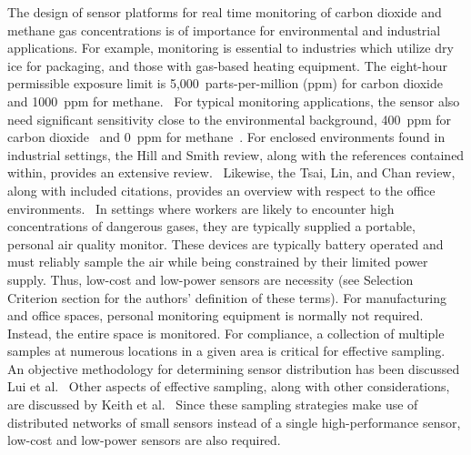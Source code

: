 \documentclass[times]{joehreview}
\begin{document}
	The design of sensor platforms for real time monitoring of carbon dioxide and methane gas concentrations is of importance for environmental and industrial applications.  For example, monitoring is essential to industries which utilize dry ice for packaging, and those with gas-based heating equipment.  The eight-hour permissible exposure limit is  5,000~parts-per-million (ppm) for carbon dioxide and 1000~ppm for methane.~\cite{centersfordiseasecontrolCentersDiseaseControl2016,centersfordiseasecontrolCentersDiseaseControl2015}  For typical monitoring applications, the sensor also need significant sensitivity close to the environmental background, 400~ppm for carbon dioxide~\cite{blasing_recent_2016,dlugokencky_trends_2016} and 0~ppm for methane~\cite{turner_large_2016,bamberger_spatial_2014,dlugokencky_trends_2016-1}.  For enclosed environments found in industrial settings, the Hill and Smith review, along with the references contained within, provides an extensive review.~\cite{exposure_assessment}  Likewise, the Tsai, Lin, and Chan review, along with included citations, provides an overview with respect to the office environments.~\cite{sick_building}  In settings where workers are likely to encounter high concentrations of dangerous gases, they are typically supplied a portable, personal air quality monitor.  These devices are typically battery operated and must reliably sample the air while being constrained by their limited power supply.  Thus, low-cost and low-power sensors are necessity (see Selection Criterion section for the authors' definition of these terms).  For manufacturing and office spaces, personal monitoring equipment is normally not required.  Instead, the entire space is monitored.  For compliance, a collection of multiple samples at numerous locations in a given area is critical for effective sampling.  An objective methodology for determining sensor distribution has been discussed Lui et al.~\cite{airquality_network}  Other aspects of effective sampling, along with other considerations, are discussed by Keith et al.~\cite{keith_principles_1983}  Since these sampling strategies make use of distributed networks of small sensors instead of a single high-performance sensor, low-cost and low-power sensors are also required.
	
\end{document}

